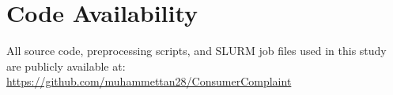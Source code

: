 \documentclass[journal]{IEEEtran}
\begin{document}
\section*{Code Availability}
All source code, preprocessing scripts, and SLURM job files used in
this study are publicly available at:
\url{https://github.com/muhammettan28/ConsumerComplaint}



\end{document}
